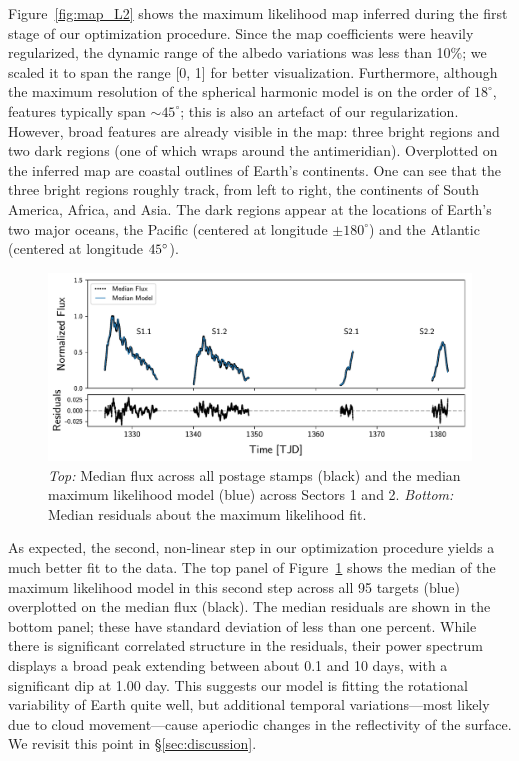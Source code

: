 \documentclass[modern]{aastex62}
\begin{document}
Figure~\ref{fig:map_L2} shows the maximum likelihood map inferred
during the first stage of our optimization procedure. Since the map
coefficients were heavily regularized, the dynamic range of the albedo
variations was less than 10\%; we scaled it to span the range [0, 1]
for better visualization. Furthermore, although the maximum resolution of
the spherical harmonic model is on 
the order of $18^\circ$, features typically span ${\sim}45^\circ$; this is
also an artefact of our regularization. However, broad features are already
visible in the map: three bright regions and two dark regions (one of which
wraps around the antimeridian). Overplotted on the inferred map are
coastal outlines of Earth's continents. One can see that the three bright regions roughly
track, from left to right, the continents  of South America,
Africa, and Asia. The dark regions
appear at the locations of Earth's two major oceans, the
Pacific (centered at longitude $\pm180^\circ$) and the Atlantic
(centered at longitude $\-45^\circ$).

\begin{figure}[t!]
    \begin{centering}
    \includegraphics[width=\linewidth]{figures/model.pdf}
    \caption{\label{fig:model}
             \emph{Top:} Median flux across all postage stamps (black) and
             the median maximum likelihood model (blue) across Sectors 1 and 2.
             \emph{Bottom:} Median residuals about the maximum likelihood fit.
             }
    \end{centering}
\end{figure}

As expected, the second, non-linear step in our optimization procedure
yields a much better fit to the data.
The top panel of Figure~\ref{fig:model} shows the median of the 
maximum likelihood model in this second step
across all 95 targets (blue) overplotted on the median flux (black). 
The median residuals are shown in the bottom panel; these have
standard deviation of less than one percent. While there is significant correlated
structure in the residuals, their power spectrum displays a broad peak extending 
between about 0.1 and 10 days, with a significant dip at 1.00 day. This
suggests our model is fitting the rotational variability of Earth quite well, but
additional temporal variations---most likely due to cloud movement---cause aperiodic
changes in the reflectivity of the surface. We revisit this point in \S\ref{sec:discussion}.
\end{document}

